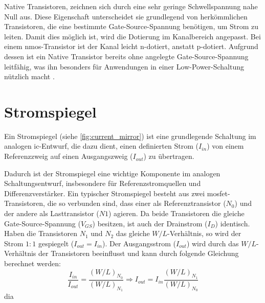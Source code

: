Native Transistoren, zeichnen sich durch eine sehr geringe Schwellspannung nahe Null aus. Diese Eigenschaft unterscheidet sie grundlegend von herkömmlichen Transistoren, die eine bestimmte Gate-Source-Spannung benötigen, um Strom zu leiten. Damit dies möglich ist, wird die Dotierung im Kanalbereich angepasst. Bei einem \gls{nmos}-Transistor ist der Kanal leicht n-dotiert, anstatt p-dotiert. Aufgrund dessen ist ein Native Transistor bereits ohne angelegte Gate-Source-Spannung leitfähig, was ihn besonders für Anwendungen in einer Low-Power-Schaltung nützlich macht \cite{Evolution}.

\section{Stromspiegel}
Ein Stromspiegel (siehe \autoref{fig:current_mirror}) ist eine grundlegende Schaltung im analogen \gls{ic}-Entwurf, die dazu dient, einen definierten Strom ($I_{in}$) von einem Referenzzweig auf einen Ausgangszweig ($I_{out}$) zu übertragen.

Dadurch ist der Stromspiegel eine wichtige Komponente im analogen Schaltungsentwurf, insbesondere für Referenzstromquellen und Differenzverstärker. Ein typischer Stromspiegel besteht aus zwei \gls{mosfet}-Transistoren, die so verbunden sind, dass einer als Referenztransistor ($N_0$) und der andere als Lasttransistor ($N1$) agieren. Da beide Transistoren die gleiche Gate-Source-Spannung ($V_{GS}$) besitzen, ist auch der Drainstrom ($I_D$) identisch. Haben die Transistoren $N_1$ und $N_2$ das gleiche $W/L$-Verhältnis, so wird der Strom $1:1$ gespiegelt ($I_{out} = I_{in}$). Der Ausgangsstrom ($I_{out}$) wird durch das $W/L$-Verhältnis der Transistoren beeinflusst und kann durch folgende Gleichung berechnet werden: 
\begin{equation}
    \frac{I_{in}}{I_{out}} = \frac{(W/L)_{N_0}}{(W/L)_{N_1}} \Rightarrow I_{out} = I_{in} \frac{(W/L)_{N_1}}{(W/L)_{N_0}}
\end{equation}dia